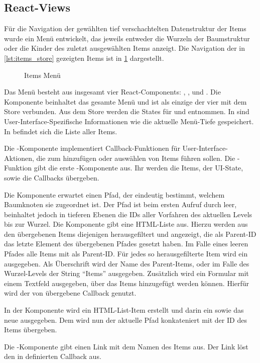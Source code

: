 \subsection{React-Views}
\label{ssec:fi_react_views}

Für die Navigation der gewählten tief verschachtelten Datenstruktur der Items
wurde ein Menü entwickelt, das jeweils entweder die Wurzeln der Baumstruktur
oder die Kinder des zuletzt ausgewählten Items anzeigt.  Die Navigation der in
\cref{lst:items_store} gezeigten Items ist in \cref{fig:items_menu} dargestellt.

\begin{figure}
	\centering
	
	\caption{Items Menü}
	\label{fig:items_menu}
\end{figure}

Das Menü besteht aus insgesamt vier React-Components: ,
,  und .  Die Komponente
 beinhaltet das gesamte Menü und ist als einzige der vier mit dem
Store verbunden.  Aus dem Store werden die States für
 und  entnommen.  In  sind
User-Interface-Spezifische Informationen wie die aktuelle Menü-Tiefe
gespeichert.  In  befindet sich die Liste aller
Items.

Die -Komponente implementiert Callback-Funktionen für
User-Interface-Aktionen, die zum hinzufügen oder auswählen von Items führen
sollen.  Die -Funktion gibt die erste -Komponente
aus.  Ihr werden die Items, der UI-State, sowie die Callbacks übergeben.

Die Komponente  erwartet einen Pfad, der eindeutig bestimmt,
welchem Baumknoten sie zugeordnet ist.  Der Pfad ist beim ersten Aufruf durch
 leer, beinhaltet jedoch in tieferen Ebenen die IDs aller Vorfahren
des aktuellen Levels bis zur Wurzel.  Die Komponente gibt eine HTML-Liste aus.
Hierzu werden aus den übergebenen Items diejenigen herausgefiltert und
angezeigt, die als Parent-ID das letzte Element des übergebenen Pfades gesetzt
haben.  Im Falle eines leeren Pfades alle Items mit  als Parent-ID.
Für jedes so herausgefilterte Item wird ein  ausgegeben.
Als Überschrift wird der Name des Parent-Items, oder im Falle des Wurzel-Levels
der String \enquote{Items} ausgegeben.  Zusätzlich wird ein Formular mit einem
Textfeld ausgegeben, über das Items hinzugefügt werden können.  Hierfür wird
der von  übergebene Callback genutzt.

In der Komponente  wird ein HTML-List-Item erstellt und
darin ein  sowie das neue  ausgegeben.  Dem
 wird nun der aktuelle Pfad konkateniert mit der ID des Items
übergeben.

Die -Komponente gibt einen Link mit dem Namen des Items aus.  Der
Link löst den in  definierten Callback aus.
